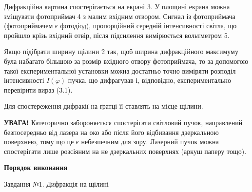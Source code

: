 \documentclass[12pt,a4paper]{article}
\begin{document}
    Дифракційна картина спостерігається на екрані 3. У площині екрана можна
    зміщувати фотоприймач 4 з малим вхідним отвором. Сигнал із фотоприймача
    (фотоприймачем є фотодіод), пропорційний середній інтенсивності світла, що
    пройшло крізь вхідний отвір, після підсилення вимірюється вольтметром 5.

    Якщо підібрати ширину щілини 2 так, щоб ширина дифракційного
    максимуму була набагато більшою за розмір вхідного отвору фотоприймача, то за
    допомогою такої експериментальної установки можна достатньо точно виміряти
    розподіл інтенсивності $I(\varphi)$ пучка, що дифрагував і, відповідно, експериментально
    перевірити вираз (3.1).

    Для спостереження дифракії на ґратці її ставлять на місце щілини.

    \textbf{УВАГА!} Категорично забороняється спостерігати світловий пучок, направлений
    безпосередньо від лазера на око або після його відбивання дзеркальною
    поверхнею, тому що це є небезпечним для зору. Лазерний пучок можна
    спостерігати лише розсіяним на не дзеркальних поверхнях (аркуш паперу тощо).

    \begin{center} \textbf{Порядок виконання} \end{center}

    Завдання №1. Дифракція на щілині
\end{document}
